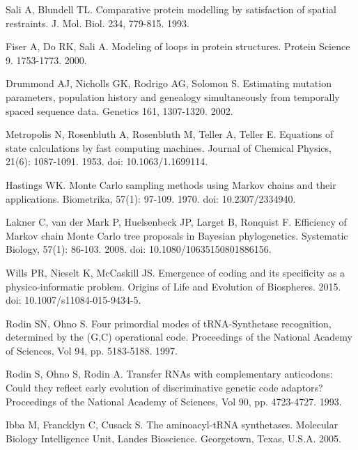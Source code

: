 \documentclass[10pt,letterpaper]{article}
\begin{document}
\begin{thebibliography}{10}
%
Sali A, Blundell TL.
\newblock Comparative protein modelling by satisfaction of spatial restraints.
\newblock J. Mol. Biol. 234, 779-815. 1993.

% 
Fiser A, Do RK, Sali A.
\newblock Modeling of loops in protein structures.
\newblock Protein Science 9. 1753-1773. 2000.

Drummond AJ, Nicholls GK, Rodrigo AG, Solomon S. 
\newblock Estimating mutation parameters, population history and genealogy simultaneously from temporally spaced sequence data.
\newblock Genetics 161, 1307-1320. 2002.

Metropolis N, Rosenbluth A, Rosenbluth M, Teller A, Teller E.
\newblock Equations of state calculations by fast computing machines.
\newblock Journal of Chemical Physics, 21(6): 1087-1091. 1953. doi: 10.1063/1.1699114.

Hastings WK.
\newblock Monte Carlo sampling methods using Markov chains and their applications.
\newblock Biometrika, 57(1): 97-109. 1970. doi: 10.2307/2334940.

Lakner C, van der Mark P, Huelsenbeck JP, Larget B, Ronquist F.
\newblock Efficiency of Markov chain Monte Carlo tree proposals in Bayesian phylogenetics.
\newblock Systematic Biology, 57(1): 86-103. 2008. doi: 10.1080/10635150801886156.

Wills PR, Nieselt K, McCaskill JS.
\newblock Emergence of coding and its specificity as a physico-informatic problem.
\newblock Origins of Life and Evolution of Biospheres. 2015. doi: 10.1007/s11084-015-9434-5.

Rodin SN, Ohno S.
\newblock Four primordial modes of tRNA-Synthetase recognition, determined by the (G,C) operational code.
\newblock Proceedings of the National Academy of Sciences, Vol 94, pp. 5183-5188. 1997.

Rodin S, Ohno S, Rodin A.
\newblock Transfer RNAs with complementary anticodons: Could they reflect early evolution of discriminative genetic code adaptors?
\newblock Proceedings of the National Academy of Sciences, Vol 90, pp. 4723-4727. 1993.

Ibba M, Francklyn C, Cusack S.
\newblock The aminoacyl-tRNA synthetases.
\newblock Molecular Biology Intelligence Unit, Landes Bioscience. Georgetown, Texas, U.S.A. 2005.


\end{thebibliography}
\end{document}
